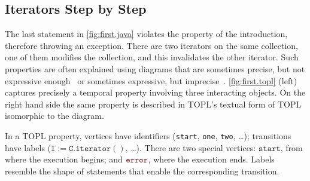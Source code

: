 \documentclass{sigplanconf}[10pt] %
\newcommand{\noterg}[2]{\textcolor{gray}{[\textcolor{red}{#1}: #2]}}
\newcommand{\dd}[1]{\noterg{dd}{#1}}
\newcommand{\dinocomment}[1]{\dd{#1}}
\newcommand{\error}{\ensuremath{\textcolor{darkred}{\mathtt{error}}}\xspace}
\newcommand{\pattern}[1]{\ensuremath{\mathtt{\underline{#1}}}}
\newcommand{\start}{\ensuremath{\mathtt{start}}\xspace}
\begin{document}
\subsection{Iterators Step by Step} \label{sec:examples.steps} %
The last statement in \autoref{fig:first.java} violates the property of the introduction, therefore throwing an exception.
There are two iterators on the same collection, one of them modifies the collection, and this invalidates the other iterator.
Such properties are often explained using diagrams that are sometimes precise, but not expressive enough~\cite{dblp:journals/scp/FieldGRY05,dblp:conf/issta/FinkYDRG06} or sometimes expressive, but imprecise~\cite{dblp:conf/oopsla/bierhoffa07,dblp:conf/oopsla/naeeml08,dblp:conf/sigsoft/boddenlh08,dblp:conf/ecoop/bierhoffba09}.
\autoref{fig:first.topl} (left)  captures precisely a temporal property involving three interacting objects.
On the right hand side  the same property is described in TOPL's textual form of TOPL isomorphic to the diagram.

In a TOPL property, vertices have identifiers (\texttt{start}, \texttt{one}, \texttt{two}, \dots);
transitions have labels ($\pattern I:=\pattern C.\mathtt{iterator}()$, \dots).
There are two special vertices: \start, from where the execution begins; and \error, where the execution ends.
Labels resemble the shape of statements that enable the corresponding transition.
\end{document}
